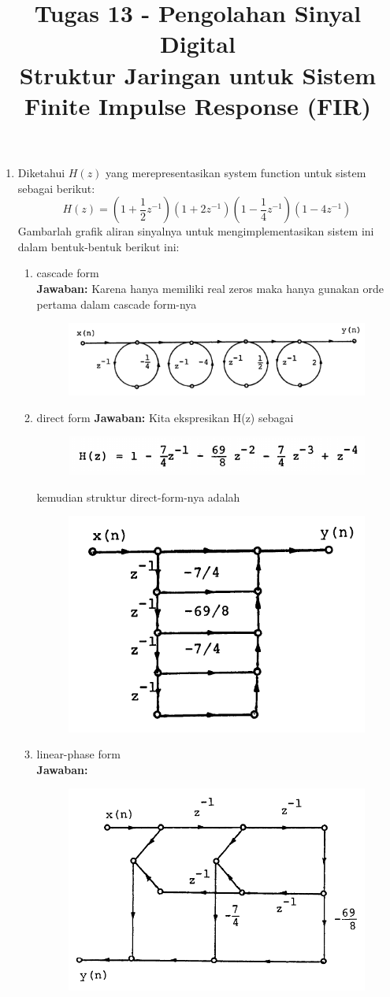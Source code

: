 \documentclass[12pt,a4paper]{article}
\title{Tugas 13 - Pengolahan Sinyal Digital\\
	Struktur Jaringan untuk Sistem Finite Impulse Response (FIR)}
\date{}
\begin{document}
	\maketitle
	\date{}
	\begin{enumerate}
		\item Diketahui $ H(z) $ yang merepresentasikan system function untuk sistem sebagai berikut:
		\[ H(z) = \left( 1 + \frac{1}{2}z^{-1} \right) \left( 1 + 2z^{-1} \right) \left( 1 - \frac{1}{4}z^{-1} \right) \left( 1 - 4z^{-1} \right)\]
		Gambarlah grafik aliran sinyalnya untuk mengimplementasikan sistem ini dalam bentuk-bentuk berikut ini:
		\begin{enumerate}
			\item cascade form\\
			\textbf{Jawaban:} Karena hanya memiliki real zeros maka hanya gunakan orde pertama dalam cascade form-nya
			\begin{figure}[H]
				\centering
				\includegraphics[width=0.7\linewidth]{img/img01}
			\end{figure}
			\item direct form
			\textbf{Jawaban:} Kita ekspresikan H(z) sebagai 
			\begin{figure}[H]
				\centering
				\includegraphics[width=0.5\linewidth]{img/img02}
			\end{figure}
			kemudian struktur direct-form-nya adalah
			\begin{figure}[H]
				\centering
				\includegraphics[width=0.5\linewidth]{img/img03}
			\end{figure}
			\item linear-phase form\\
			\textbf{Jawaban:}
			\begin{figure}[H]
				\centering
				\includegraphics[width=0.5\linewidth]{img/img04}
			\end{figure}
		\end{enumerate}
	\end{enumerate}
\end{document}
